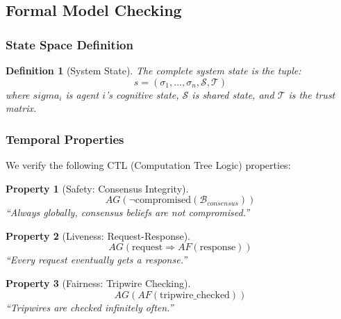 \documentclass[
]{article}
\newtheorem{definition}{Definition}[section]
\newtheorem{property}{Property}[section]
\begin{document}
\subsection{Formal Model Checking}\label{sec:model-checking}

\subsubsection{State Space Definition}\label{sec:state-space}

\begin{definition}[System State]
\label{def:system-state-verification}
The complete system state is the tuple:
\begin{equation}
\label{eq:system-state-verification}
s = (\sigma_1, \ldots, \sigma_n, \mathcal{S}, \mathcal{T})
\end{equation}
where $sigma_i$ is agent $i$'s cognitive state, $\mathcal{S}$ is shared state, and $\mathcal{T}$ is the trust matrix.
\end{definition}

\subsubsection{Temporal Properties}\label{sec:temporal-properties}

We verify the following CTL (Computation Tree Logic) properties:

\begin{property}[Safety: Consensus Integrity]
\label{prop:ctl-safety}
\begin{equation}
\label{eq:ctl-safety}
AG(\neg \text{compromised}(\mathcal{B}_{consensus}))
\end{equation}
``Always globally, consensus beliefs are not compromised.''
\end{property}

\begin{property}[Liveness: Request-Response]
\label{prop:ctl-liveness}
\begin{equation}
\label{eq:ctl-liveness}
AG(\text{request} \Rightarrow AF(\text{response}))
\end{equation}
``Every request eventually gets a response.''
\end{property}

\begin{property}[Fairness: Tripwire Checking]
\label{prop:ctl-fairness}
\begin{equation}
\label{eq:ctl-fairness}
AG(AF(\text{tripwire\_checked}))
\end{equation}
``Tripwires are checked infinitely often.''
\end{property}
\end{document}
